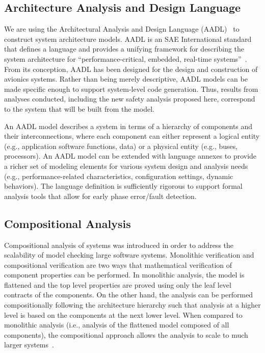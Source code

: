 \subsection{Architecture Analysis and Design Language}
We are using the Architectural Analysis and Design Language (AADL)~\cite{FeilerModelBasedEngineering2012} to construct system architecture models.  AADL is an SAE International standard that defines a language and provides a unifying framework for describing the system architecture for ``performance-critical, embedded, real-time systems''~\cite{AADL_Standard}. From its conception, AADL has been designed for the design and construction of avionics systems.  Rather than being merely descriptive, AADL models can be made specific enough to support system-level code generation.  Thus, results from analyses conducted, including the new safety analysis proposed here, correspond to the system that will be built from the model.  

An AADL model describes a system in terms of a hierarchy of components and their interconnections, where each component can either represent a logical entity (e.g., application software functions, data) or a physical entity (e.g., buses, processors). An AADL model can be extended with language annexes to provide a richer set of modeling elements for various system design and analysis needs (e.g., performance-related characteristics, configuration settings, dynamic behaviors). The language definition is sufficiently rigorous to support formal analysis tools that allow for early phase error/fault detection.

\subsection{Compositional Analysis} Compositional analysis of systems was introduced in order to address the scalability of model checking large software systems. Monolithic verification and compositional verification are two ways that mathematical verification of component properties can be performed. In monolithic analysis, the model is flattened and the top level properties are proved using only the leaf level contracts of the components. On the other hand, the analysis can be performed compositionally following the architecture hierarchy such that analysis at a higher level is based on the components at the next lower level.  When compared to monolithic analysis (i.e., analysis of the flattened model composed of all components), the compositional approach allows the analysis to scale to much larger systems~\cite{NFM2012:CoGaMiWhLaLu}. 

